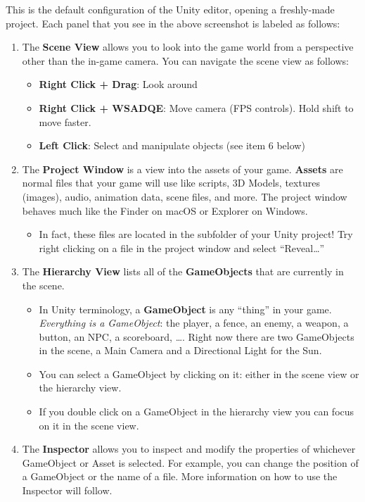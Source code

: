 \documentclass[11pt]{article}
\begin{document}
This is the default configuration of the Unity editor, opening a freshly-made project.  Each panel that you see in the above screenshot is labeled as follows:

\begin{enumerate}
    \item The \textbf{Scene View} allows you to look into the game world from a perspective other than the in-game camera.  You can navigate the scene view as follows:
    \begin{itemize}
        \item \textbf{Right Click + Drag}: Look around
        \item \textbf{Right Click + WSADQE}: Move camera (FPS controls).  Hold shift to move faster.
        \item \textbf{Left Click}: Select and manipulate objects (see item 6 below)
    \end{itemize}
    \item The \textbf{Project Window} is a view into the assets of your game.  \textbf{Assets} are normal files that your game will use like scripts, 3D Models, textures (images), audio, animation data, scene files, and more.  The project window behaves much like the Finder on macOS or Explorer on Windows.
    \begin{itemize}
        \item In fact, these files are located in the  subfolder of your Unity project!  Try right clicking on a file in the project window and select ``Reveal\dots''
    \end{itemize}
    \item The \textbf{Hierarchy View} lists all of the \textbf{GameObjects} that are currently in the scene.
    \begin{itemize}
        \item In Unity terminology, a \textbf{GameObject} is any ``thing'' in your game.  \textit{Everything is a GameObject}: the player, a fence, an enemy, a weapon, a button, an NPC, a scoreboard, \dots.  Right now there are two GameObjects in the scene, a Main Camera and a Directional Light for the Sun.
        \item You can select a GameObject by clicking on it: either in the scene view or the hierarchy view.
        \item If you double click on a GameObject in the hierarchy view you can focus on it in the scene view.
    \end{itemize}
    \item The \textbf{Inspector} allows you to inspect and modify the properties of whichever GameObject or Asset is selected.  For example, you can change the position of a GameObject or the name of a file.  More information on how to use the Inspector will follow.

\end{enumerate}
\end{document}
